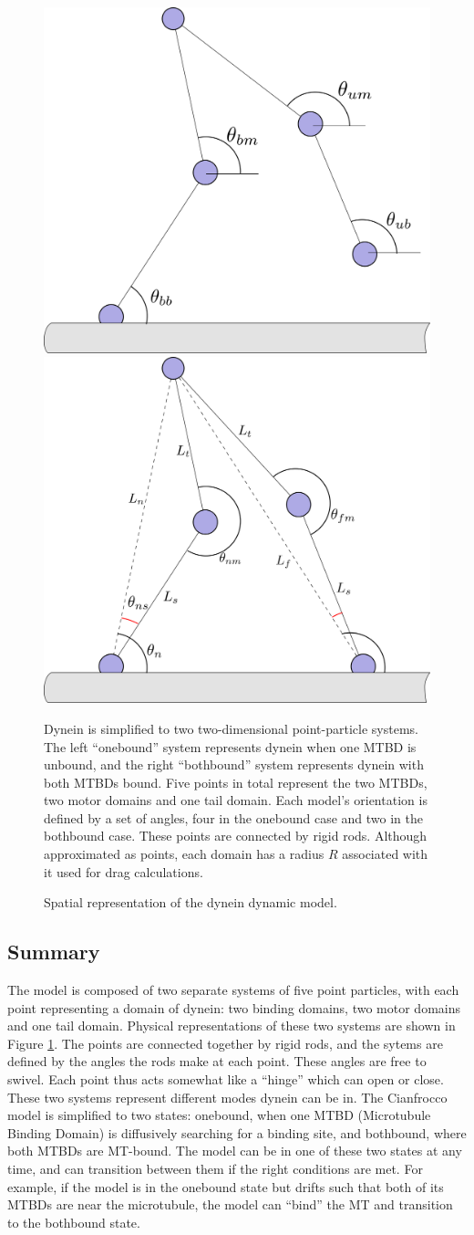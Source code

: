 \documentclass[
11pt, %
english, %
singlespacing, %
headsepline, %
chapterinoneline, %
]{MastersDoctoralThesis} %
\begin{document}
\begin{figure}[h]
  \centering
  \includegraphics[width=.45\textwidth]{../../figures/theory-onebound}
  \includegraphics[width=.45\textwidth]{../../figures/theory-bothbound}
  \caption{Spatial representation of the dynein dynamic model.}{Dynein is simplified to two two-dimensional point-particle systems. The left ``onebound'' system represents dynein when one MTBD is unbound, and the right ``bothbound'' system represents dynein with both MTBDs bound. Five points in total represent the two MTBDs, two motor domains and one tail domain. Each model's orientation is defined by a set of angles, four in the onebound case and two in the bothbound case. These points are connected by rigid rods. Although approximated as points, each domain has a radius $R$ associated with it used for drag calculations.}
  \label{fig:theory-intro}
\end{figure}

\subsection{Summary}
The model is composed of two separate systems of five point particles, with each point representing a domain of dynein: two binding domains, two motor domains and one tail domain. Physical representations of these two systems are shown in Figure \ref{fig:theory-intro}. The points are connected together by rigid rods, and the sytems are defined by the angles the rods make at each point. These angles are free to swivel. Each point thus acts somewhat like a ``hinge'' which can open or close. These two systems represent different modes dynein can be in. The Cianfrocco model is simplified to two states: onebound, when one MTBD (Microtubule Binding Domain) is diffusively searching for a binding site, and bothbound, where both MTBDs are MT-bound. The model can be in one of these two states at any time, and can transition between them if the right conditions are met. For example, if the model is in the onebound state but drifts such that both of its MTBDs are near the microtubule, the model can ``bind'' the MT and transition to the bothbound state.\\
\end{document}
